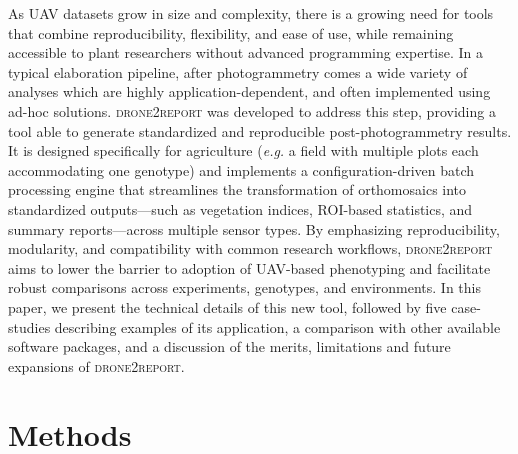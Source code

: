 \documentclass[drones,technicalnote,accept,pdftex,moreauthors]{Definitions/mdpi}
\begin{document}
As UAV datasets grow in size and complexity, there is a growing need for tools that combine reproducibility, flexibility, and ease of use, while remaining accessible to plant researchers without advanced programming expertise. In a typical elaboration pipeline, after photogrammetry comes a wide variety of analyses which are highly application-dependent, and often implemented using ad-hoc solutions. \textsc{drone2report} was developed to address this step, providing a tool able to generate standardized and reproducible post-photogrammetry results. It is designed specifically for agriculture (\textit{e.g.} a field with multiple plots each accommodating one genotype) and implements a configuration-driven batch processing engine that streamlines the transformation of orthomosaics into standardized outputs—such as vegetation indices, ROI-based statistics, and summary reports—across multiple sensor types. By emphasizing reproducibility, modularity, and compatibility with common research workflows, \textsc{drone2report} aims to lower the barrier to adoption of UAV-based phenotyping and facilitate robust comparisons across experiments, genotypes, and environments. 
In this paper, we present the technical details of this new tool, followed by five case-studies describing examples of its application, a comparison with other available software packages, and a discussion of the merits, limitations and future expansions of \textsc{drone2report}.

\section{Methods}
\label{methods}
\end{document}

